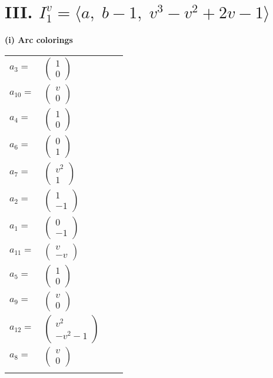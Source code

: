 \documentclass[1p]{elsarticle_modified}
\theoremstyle{definition}
\begin{document}
\centering \section*{III. $I^v_{1}= \langle a,\;b-1,\;v^3- v^2+2 v-1 \rangle$}
\flushleft \textbf{(i) Arc colorings}\\
\begin{tabular}{m{7pt} m{180pt} m{7pt} m{180pt} }
\flushright $a_{3}=$&$\begin{pmatrix}1\\0\end{pmatrix}$ \\
\flushright $a_{10}=$&$\begin{pmatrix}v\\0\end{pmatrix}$ \\
\flushright $a_{4}=$&$\begin{pmatrix}1\\0\end{pmatrix}$ \\
\flushright $a_{6}=$&$\begin{pmatrix}0\\1\end{pmatrix}$ \\
\flushright $a_{7}=$&$\begin{pmatrix}v^2\\1\end{pmatrix}$ \\
\flushright $a_{2}=$&$\begin{pmatrix}1\\-1\end{pmatrix}$ \\
\flushright $a_{1}=$&$\begin{pmatrix}0\\-1\end{pmatrix}$ \\
\flushright $a_{11}=$&$\begin{pmatrix}v\\- v\end{pmatrix}$ \\
\flushright $a_{5}=$&$\begin{pmatrix}1\\0\end{pmatrix}$ \\
\flushright $a_{9}=$&$\begin{pmatrix}v\\0\end{pmatrix}$ \\
\flushright $a_{12}=$&$\begin{pmatrix}v^2\\- v^2-1\end{pmatrix}$ \\
\flushright $a_{8}=$&$\begin{pmatrix}v\\0\end{pmatrix}$\\&\end{tabular}
\end{document}
